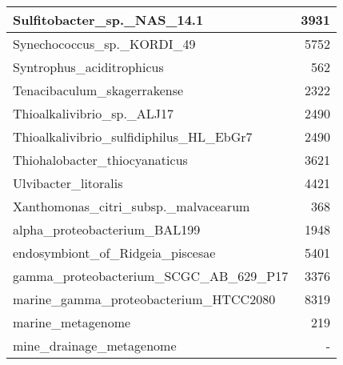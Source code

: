 \documentclass[12pt,a4paper]{article}
\begin{document}
\begin{table}[ht]
\begin{center}
\begin{tabular}{|l*{1}{|r}|}
Sulfitobacter\_sp.\_NAS\_14.1 & 3931 \\ \hline
Synechococcus\_sp.\_KORDI\_49 & 5752 \\ \hline
Syntrophus\_aciditrophicus & 562 \\ \hline
Tenacibaculum\_skagerrakense & 2322 \\ \hline
Thioalkalivibrio\_sp.\_ALJ17 & 2490 \\ \hline
Thioalkalivibrio\_sulfidiphilus\_HL\_EbGr7 & 2490 \\ \hline
Thiohalobacter\_thiocyanaticus & 3621 \\ \hline
Ulvibacter\_litoralis & 4421 \\ \hline
Xanthomonas\_citri\_subsp.\_malvacearum & 368 \\ \hline
alpha\_proteobacterium\_BAL199 & 1948 \\ \hline
endosymbiont\_of\_Ridgeia\_piscesae & 5401 \\ \hline
gamma\_proteobacterium\_SCGC\_AB\_629\_P17 & 3376 \\ \hline
marine\_gamma\_proteobacterium\_HTCC2080 & 8319 \\ \hline
marine\_metagenome & 219 \\ \hline
mine\_drainage\_metagenome & - \\ \hline
\end{tabular}
\end{center}
\end{table}
\end{document}

